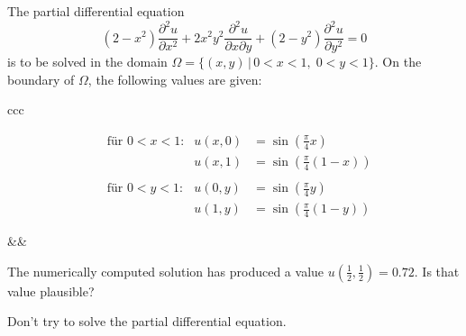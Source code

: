 The partial differential equation
\begin{equation}
(2-x^2)\frac{\partial^2 u}{\partial x^2}
+
2x^2y^2\frac{\partial^2 u}{\partial x\partial y}
+
(2-y^2)\frac{\partial^2 u}{\partial y^2}
=0
\label{70000008:pdgl}
\end{equation}
is to be solved in the domain
$\Omega=\{(x,y)\,|\, 0< x<1,\; 0<y<1\}$.
On the boundary of $\Omega$, the following values are given:
\begin{center}
\begin{tabular}{ccc}
\begin{minipage}{6cm}
\[
\begin{aligned}
&\text{für $0<x<1$:}&
u(x,0)&=\sin({\textstyle\frac\pi4} x)\\
&&
u(x,1)&=\sin({\textstyle\frac\pi4}(1-x))\\
\\
&\text{für $0<y<1$:}&
u(0,y)&=\sin({\textstyle\frac\pi4}y)\\
&&
u(1,y)&=\sin({\textstyle\frac\pi4}(1-y))
\end{aligned}
\]
\end{minipage}
&\qquad\qquad&
\begin{minipage}{8cm}
\begin{center}
\end{center}
\end{minipage}
\end{tabular}
\end{center}

The numerically computed solution has produced a value
$u(\frac12,\frac12)=0.72$.
Is that value plausible?

\begin{hinweis}
Don't try to solve the partial differential equation.
\end{hinweis}

